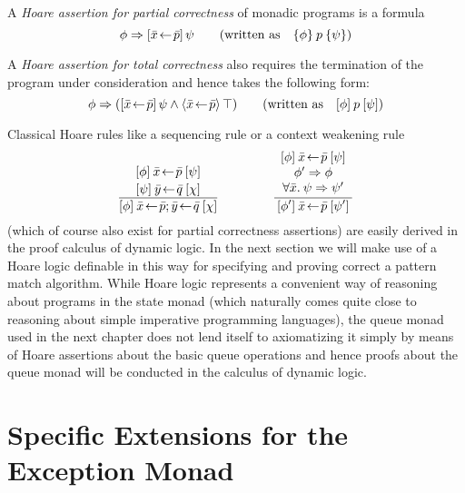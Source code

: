 \begin{defn}
  \label{defn:hoare-assns}
  A \emph{Hoare assertion for partial correctness} of monadic programs is a formula
  \[ \phi \Rightarrow [\bar x\!\gets\! \bar p]\,{\psi} \qquad (\text{written as} \quad
  \{\phi\}\:p\:\{\psi\}) \] 

  A \emph{Hoare assertion for total correctness} also requires the termination of the
  program under consideration and hence takes the following form:
  \[ \phi \Rightarrow ([\bar x\!\gets\! \bar p]\,{\psi} \land \langle\bar x\!\gets\!\bar p\rangle\,{\top})
  \qquad (\text{written as} \quad 
  [\phi]\:p\:[\psi]) \]
\end{defn}

Classical Hoare rules like a sequencing rule or a context weakening rule
\[
  \Rule{\displaystyle \datop{\THTriple{\phi}{\bar x\leteq\bar p}{\psi}} 
      {\THTriple{\psi}{\bar y\leteq\bar q}{\chi}}}
       {\THTriple{\phi}{\bar x\leteq\bar p; \bar y\leteq \bar q}{\chi}}
       \hspace*{15mm}
  \Rule{\begin{array}{c} \THTriple{\phi}{\bar x\leteq \bar p}{\psi} \\
             \phi' \Rightarrow \phi \\  \forall\bar x\bdot \psi \Rightarrow \psi' \end{array}}
       {\THTriple{\phi'}{\bar x\leteq\bar p}{\psi'}}
\]
(which of course also exist for partial correctness assertions) are easily
derived in the proof calculus of dynamic logic. In the next section we will  make
use of a Hoare logic definable in this way for specifying and 
proving correct a pattern match algorithm. While Hoare logic represents a
convenient way of reasoning about programs in the state monad (which naturally
comes quite close to reasoning about simple imperative programming languages),
\EG the queue monad used in the next chapter does not lend itself to
axiomatizing it simply by means of Hoare assertions about the basic queue
operations and hence proofs about the queue monad will be conducted in the
calculus of dynamic logic.

\section{Specific Extensions for the Exception Monad}
\label{sec:spec-extens-except}

